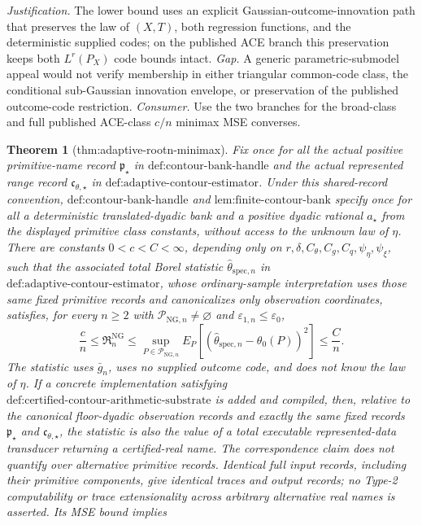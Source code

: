 \documentclass{article}
\newtheorem{theorem}{Theorem}
\begin{document}
\par\smallskip\noindent \textit{Justification.} The lower bound uses an explicit Gaussian-outcome-innovation path that preserves the law of \((X,T)\), both regression functions, and the deterministic supplied codes; on the published ACE branch this preservation keeps both \(L^r(P_X)\) code bounds intact. \textit{Gap.} A generic parametric-submodel appeal would not verify membership in either triangular common-code class, the conditional sub-Gaussian innovation envelope, or preservation of the published outcome-code restriction. \textit{Consumer.} Use the two branches for the broad-class and full published ACE-class \(c/n\) minimax MSE converses.

\begin{theorem}[thm:adaptive-rootn-minimax]\label{thm:adaptive-rootn-minimax}
Fix once for all the actual positive primitive-name record \(\mathfrak p_{\star}\) in \(\text{def:contour-bank-handle}\) and the actual represented range record \(\mathfrak c_{\theta,\star}\) in \(\text{def:adaptive-contour-estimator}\). Under this shared-record convention, \(\text{def:contour-bank-handle}\) and \(\text{lem:finite-contour-bank}\) specify once for all a deterministic translated-dyadic bank and a positive dyadic rational \(a_{\star}\) from the displayed primitive class constants, without access to the unknown law of \(\eta\). There are constants \(0<c<C<\infty\), depending only on \(r,\delta,C_{\theta},C_g,C_q,\psi_{\eta},\psi_{\xi}\), such that the associated total Borel statistic \(\widehat\theta_{\mathrm{spec},n}\) in \(\text{def:adaptive-contour-estimator}\), whose ordinary-sample interpretation uses those same fixed primitive records and canonicalizes only observation coordinates, satisfies, for every \(n\ge2\) with \(\mathcal P_{\mathrm{NG},n}\neq\varnothing\) and \(\varepsilon_{1,n}\le\varepsilon_0\),
\[
 \frac cn\le\mathfrak R_n^{\mathrm{NG}}
 \le\sup_{P\in\mathcal P_{\mathrm{NG},n}}
 E_P[(\widehat\theta_{\mathrm{spec},n}-\theta_0(P))^2]
 \le\frac Cn.
\]
The statistic uses \(\bar g_n\), uses no supplied outcome code, and does not know the law of \(\eta\). If a concrete implementation satisfying \(\text{def:certified-contour-arithmetic-substrate}\) is added and compiled, then, relative to the canonical floor-dyadic observation records and exactly the same fixed records \(\mathfrak p_{\star}\) and \(\mathfrak c_{\theta,\star}\), the statistic is also the value of a total executable represented-data transducer returning a certified-real name. The correspondence claim does not quantify over alternative primitive records. Identical full input records, including their primitive components, give identical traces and output records; no Type-2 computability or trace extensionality across arbitrary alternative real names is asserted. Its MSE bound implies

\end{theorem}
\end{document}
